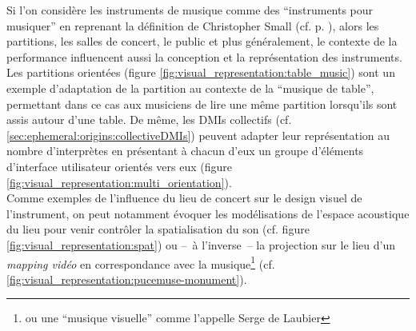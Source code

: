 \noindent Si l'on considère les instruments de musique comme des ``instruments pour musiquer'' en reprenant la définition de Christopher Small (cf. p. \pageref{def:musicking}), alors les partitions, les salles de concert, le public et plus généralement, le contexte de la performance influencent aussi la conception et la représentation des instruments. Les partitions orientées (figure \ref{fig:visual_representation:table_music}) sont un exemple d'adaptation de la partition au contexte de la ``musique de table'', permettant dans ce cas aux musiciens de lire une même partition lorsqu'ils sont assis autour d'une table. De même, les \glspl{DMI} collectifs (cf. \ref{sec:ephemeral:origins:collectiveDMIs}) peuvent adapter leur représentation au nombre d'interprètes en présentant à chacun d'eux un groupe d'éléments d'interface utilisateur orientés vers eux (figure \ref{fig:visual_representation:multi_orientation}).\\
\indent Comme exemples de l'influence du lieu de concert sur le design visuel de l'instrument, on peut notamment évoquer les modélisations de l'espace acoustique du lieu pour venir contrôler la spatialisation du son (cf. figure \ref{fig:visual_representation:spat}) ou --~à l'inverse~-- la projection sur le lieu d'un \textit{mapping vidéo} en correspondance avec la musique\footnote{ou une ``musique visuelle'' comme l'appelle Serge de Laubier} (cf. \ref{fig:visual_representation:pucemuse-monument}).

